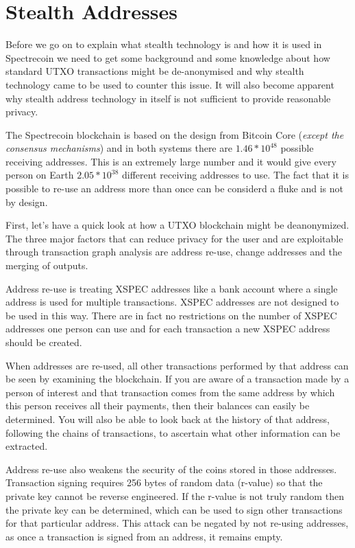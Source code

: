 \section{Stealth Addresses}
Before we go on to explain what stealth technology is and how it is used in
Spectrecoin we need to get some background and some knowledge about how
standard UTXO transactions might be de-anonymised and why stealth technology
came to be used to counter this issue. It will also become apparent why
stealth address technology in itself is not sufficient to provide reasonable
privacy.



The Spectrecoin blockchain is based on the design from Bitcoin Core 
(\textit{except the consensus mechanisms}) and in both systems there are 
$1.46 \ast 10^{48}$ possible receiving addresses. This is an extremely 
large number and it would give every person on Earth $2.05 \ast 10^{38}$ 
different receiving addresses to use. The fact that it is possible
to re-use an address more than once can be considerd a fluke and is not by
design.



First, let’s have a quick look at how a UTXO blockchain might be deanonymized.
The three major factors that can reduce privacy for the user and are exploitable
through transaction graph analysis are address re-use, change addresses and the
merging of outputs.



Address re-use is treating XSPEC addresses like a bank account where a single
address is used for multiple transactions. XSPEC addresses are not designed to
be used in this way. There are in fact no restrictions on the number of XSPEC
addresses one person can use and for each transaction a new XSPEC address should
be created.



When addresses are re-used, all other transactions performed by that address
can be seen by examining the blockchain. If you are aware of a transaction
made by a person of interest and that transaction comes from the same address
by which this person receives all their payments, then their balances can
easily be determined. You will also be able to look back at the history of
that address, following the chains of transactions, to ascertain what other
information can be extracted.



Address re-use also weakens the security of the coins stored in those addresses.
Transaction signing requires 256 bytes of random data (r-value) so that the
private key cannot be reverse engineered. If the r-value is not truly random
then the private key can be determined, which can be used to sign other
transactions for that particular address. This attack can be negated by
not re-using addresses, as once a transaction is signed from an address,
it remains empty.



